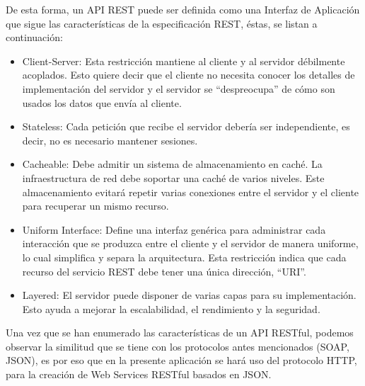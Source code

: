 De esta forma, un API REST puede ser definida como una Interfaz de Aplicación que sigue las características de la especificación REST, éstas, se listan a continuación:
\begin{itemize}
	\item Client-Server:  Esta restricción mantiene al cliente y al servidor débilmente acoplados. Esto quiere decir que el cliente no necesita conocer los detalles de implementación del servidor  y el servidor se “despreocupa” de cómo son usados los datos que envía al cliente.
	\item Stateless:  Cada petición que recibe el servidor debería ser independiente, es decir, no es necesario mantener sesiones.
	\item Cacheable: Debe admitir un sistema de almacenamiento en caché. La infraestructura de red debe soportar una caché de varios niveles. Este almacenamiento evitará repetir varias conexiones entre el servidor y el cliente para recuperar un mismo recurso.
	\item Uniform Interface: Define una interfaz genérica para administrar cada interacción que se produzca entre el cliente y el servidor de manera uniforme, lo cual simplifica y separa la arquitectura. Esta restricción indica que cada recurso del servicio REST debe tener una única dirección, “URI”.
	\item Layered: El servidor puede disponer de varias capas para su implementación. Esto ayuda a mejorar la escalabilidad, el rendimiento y la seguridad.
\end{itemize}
Una vez que se han enumerado las características de un API RESTful, podemos observar la similitud que se tiene con los protocolos antes mencionados (SOAP, JSON), es por eso que en la presente aplicación se hará uso del protocolo HTTP, para la creación de Web Services RESTful basados en JSON.

